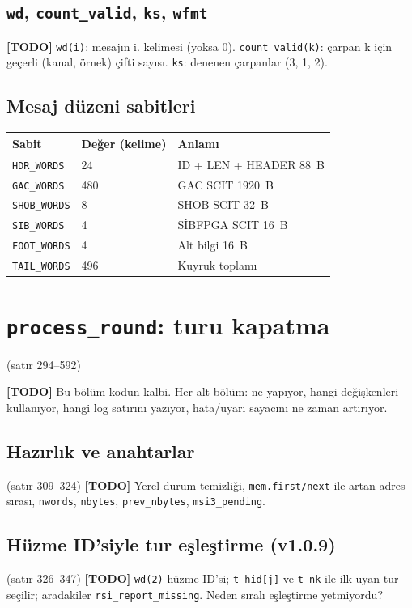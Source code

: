 \documentclass[11pt,a4paper]{article}
\newcommand{\kod}[1]{\texttt{#1}}
\newcommand{\todo}[1]{\textcolor{red!60!black}{\textbf{[TODO]} #1}}
\newcommand{\satir}[1]{\textcolor{black!60}{\scriptsize(satır #1)}}
\begin{document}
\subsection{\kod{wd}, \kod{count\_valid}, \kod{ks}, \kod{wfmt}}
\todo{\kod{wd(i)}: mesajın i. kelimesi (yoksa 0). \kod{count\_valid(k)}: çarpan k
için geçerli (kanal, örnek) çifti sayısı. \kod{ks}: denenen çarpanlar (3, 1, 2).}

\subsection{Mesaj düzeni sabitleri}
\begin{table}[h]
\centering
\begin{tabular}{@{}lll@{}}
\toprule
Sabit & Değer (kelime) & Anlamı \\
\midrule
\kod{HDR\_WORDS} & 24 & ID + LEN + HEADER 88~B \\
\kod{GAC\_WORDS} & 480 & GAC SCIT 1920~B \\
\kod{SHOB\_WORDS} & 8 & SHOB SCIT 32~B \\
\kod{SIB\_WORDS} & 4 & SİBFPGA SCIT 16~B \\
\kod{FOOT\_WORDS} & 4 & Alt bilgi 16~B \\
\kod{TAIL\_WORDS} & 496 & Kuyruk toplamı \\
\bottomrule
\end{tabular}
\end{table}

\section{\kod{process\_round}: turu kapatma}
\satir{294--592}

\todo{Bu bölüm kodun kalbi. Her alt bölüm: ne yapıyor, hangi değişkenleri kullanıyor,
hangi log satırını yazıyor, hata/uyarı sayacını ne zaman artırıyor.}

\subsection{Hazırlık ve anahtarlar}
\satir{309--324} \todo{Yerel durum temizliği, \kod{mem.first/next} ile artan adres
sırası, \kod{nwords}, \kod{nbytes}, \kod{prev\_nbytes}, \kod{msi3\_pending}.}

\subsection{Hüzme ID'siyle tur eşleştirme (v1.0.9)}
\satir{326--347} \todo{\kod{wd(2)} hüzme ID'si; \kod{t\_hid[j]} ve \kod{t\_nk}
ile ilk uyan tur seçilir; aradakiler \kod{rsi\_report\_missing}. Neden sıralı
eşleştirme yetmiyordu?}
\end{document}
